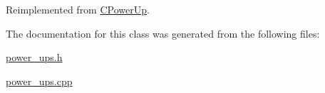 Reimplemented from \hyperlink{classCPowerUp_af1e0bad769efcde21858144596212e01}{C\+Power\+Up}.



The documentation for this class was generated from the following files\+:\begin{DoxyCompactItemize}
\item 
\hyperlink{power__ups_8h}{power\+\_\+ups.\+h}\item 
\hyperlink{power__ups_8cpp}{power\+\_\+ups.\+cpp}\end{DoxyCompactItemize}
